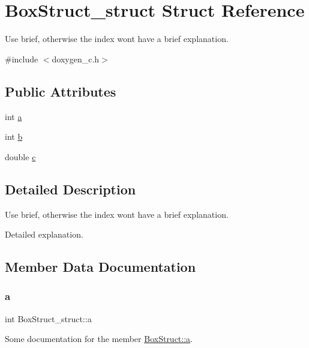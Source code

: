 \hypertarget{struct_box_struct__struct}{}\section{Box\+Struct\+\_\+struct Struct Reference}
\label{struct_box_struct__struct}


Use brief, otherwise the index won\textquotesingle{}t have a brief explanation.  




{\ttfamily \#include $<$doxygen\+\_\+c.\+h$>$}

\subsection*{Public Attributes}
\begin{DoxyCompactItemize}
\item 
int \mbox{\hyperlink{struct_box_struct__struct_a4593938c5e90f024e7971bdb1392d9d6}{a}}
\item 
int \mbox{\hyperlink{struct_box_struct__struct_aee44748dc579c5d794853ee8b133d197}{b}}
\item 
double \mbox{\hyperlink{struct_box_struct__struct_a4543370ed67b2cf5ae3f55201bea11e6}{c}}
\end{DoxyCompactItemize}


\subsection{Detailed Description}
Use brief, otherwise the index won\textquotesingle{}t have a brief explanation. 

Detailed explanation. 

\subsection{Member Data Documentation}
\mbox{\label{struct_box_struct__struct_a4593938c5e90f024e7971bdb1392d9d6}} 
\subsubsection{\texorpdfstring{a}{a}}
{\footnotesize\ttfamily int Box\+Struct\+\_\+struct\+::a}

Some documentation for the member \mbox{\hyperlink{struct_box_struct__struct_a4593938c5e90f024e7971bdb1392d9d6}{Box\+Struct\+::a}}. \mbox{\label{struct_box_struct__struct_aee44748dc579c5d794853ee8b133d197}} 
